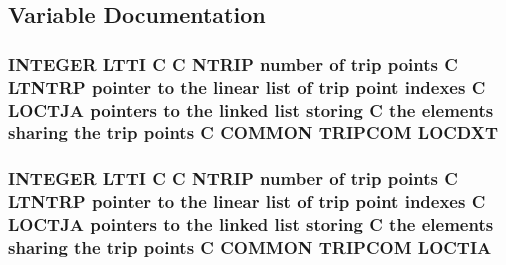 \subsection{Variable Documentation}
\hypertarget{home_2abonfi_2_c_f_d__codes_2_eul_f_s_83_84_2include_2trip_8com_a23376c308ff91ab97412c3efa31ea746}{
\subsubsection[{L\-O\-C\-D\-X\-T}]{\setlength{\rightskip}{0pt plus 5cm}I\-N\-T\-E\-G\-E\-R L\-T\-T\-I C C {\bf N\-T\-R\-I\-P} number of trip points C L\-T\-N\-T\-R\-P pointer to the linear list of trip point indexes C {\bf L\-O\-C\-T\-J\-A} pointers to the linked list storing C the elements sharing the trip points C C\-O\-M\-M\-O\-N T\-R\-I\-P\-C\-O\-M L\-O\-C\-D\-X\-T}}\label{home_2abonfi_2_c_f_d__codes_2_eul_f_s_83_84_2include_2trip_8com_a23376c308ff91ab97412c3efa31ea746}
\hypertarget{home_2abonfi_2_c_f_d__codes_2_eul_f_s_83_84_2include_2trip_8com_a9410695829be46f3379b92d229aab0aa}{
\subsubsection[{L\-O\-C\-T\-I\-A}]{\setlength{\rightskip}{0pt plus 5cm}I\-N\-T\-E\-G\-E\-R L\-T\-T\-I C C {\bf N\-T\-R\-I\-P} number of trip points C L\-T\-N\-T\-R\-P pointer to the linear list of trip point indexes C {\bf L\-O\-C\-T\-J\-A} pointers to the linked list storing C the elements sharing the trip points C C\-O\-M\-M\-O\-N T\-R\-I\-P\-C\-O\-M L\-O\-C\-T\-I\-A}}\label{home_2abonfi_2_c_f_d__codes_2_eul_f_s_83_84_2include_2trip_8com_a9410695829be46f3379b92d229aab0aa}
